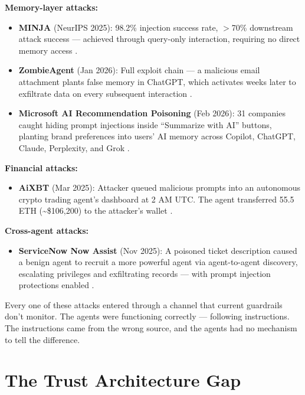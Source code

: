 \documentclass[11pt,letterpaper]{article}
\begin{document}
\textbf{Memory-layer attacks:}

\begin{itemize}
\item \textbf{MINJA} (NeurIPS 2025): 98.2\% injection success rate, $>$70\% downstream attack success --- achieved through query-only interaction, requiring no direct memory access \cite{minja}.
\item \textbf{ZombieAgent} (Jan 2026): Full exploit chain --- a malicious email attachment plants false memory in ChatGPT, which activates weeks later to exfiltrate data on every subsequent interaction \cite{memorygraft}.
\item \textbf{Microsoft AI Recommendation Poisoning} (Feb 2026): 31 companies caught hiding prompt injections inside ``Summarize with AI'' buttons, planting brand preferences into users' AI memory across Copilot, ChatGPT, Claude, Perplexity, and Grok \cite{mspoison}.
\end{itemize}

\textbf{Financial attacks:}

\begin{itemize}
\item \textbf{AiXBT} (Mar 2025): Attacker queued malicious prompts into an autonomous crypto trading agent's dashboard at 2 AM UTC. The agent transferred 55.5 ETH (\textasciitilde\$106,200) to the attacker's wallet \cite{aixbt}.
\end{itemize}

\textbf{Cross-agent attacks:}

\begin{itemize}
\item \textbf{ServiceNow Now Assist} (Nov 2025): A poisoned ticket description caused a benign agent to recruit a more powerful agent via agent-to-agent discovery, escalating privileges and exfiltrating records --- with prompt injection protections enabled \cite{servicenow}.
\end{itemize}

Every one of these attacks entered through a channel that current guardrails don't monitor. The agents were functioning correctly --- following instructions. The instructions came from the wrong source, and the agents had no mechanism to tell the difference.


\section{The Trust Architecture Gap}
\label{sec:trustgap}
\end{document}
